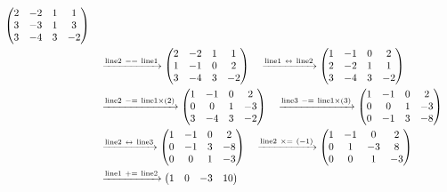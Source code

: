 \documentclass{ltjsarticle}
\begin{document}
\begin{align*}
 \begin{pmatrix}
 2 & - 2 & 1 & 1\\
 3 & - 3 & 1 & 3\\
 3 & - 4 & 3 & - 2
\end{pmatrix}\allowdisplaybreaks\\
&\ \ \ \xrightarrow{ \text{line} 2 \ -=\  \text{line} 1 } %
\begin{pmatrix}
 2 & - 2 & 1 & 1\\
 1 & -1 & 0 & 2\\
 3 & - 4 & 3 & - 2
\end{pmatrix}\ \ \ \xrightarrow{ \text{line} 1 \ \leftrightarrow\  \text{line} 2 } %
\begin{pmatrix}
 1 & -1 & 0 & 2\\
 2 & - 2 & 1 & 1\\
 3 & - 4 & 3 & - 2
\end{pmatrix}\allowdisplaybreaks\\
 &\ \ \ \xrightarrow{ \text{line} 2 \ -=\  \text{line} 1 \times\left( 2 \right)} %
\begin{pmatrix}
 1 & -1 & 0 & 2\\
 0 & 0 & 1 & - 3\\
 3 & - 4 & 3 & - 2
\end{pmatrix}\ \ \ \xrightarrow{ \text{line} 3 \ -=\  \text{line} 1 \times\left( 3 \right)} %
\begin{pmatrix}
 1 & -1 & 0 & 2\\
 0 & 0 & 1 & - 3\\
 0 & -1 & 3 & - 8
\end{pmatrix}\allowdisplaybreaks\\
 &\ \ \ \xrightarrow{ \text{line} 2 \ \leftrightarrow\  \text{line} 3 } %
\begin{pmatrix}
 1 & -1 & 0 & 2\\
 0 & -1 & 3 & - 8\\
 0 & 0 & 1 & - 3
\end{pmatrix}\ \ \ \xrightarrow{ \text{line} 2 \ \times=\ \left( - 1 \right)} %
\begin{pmatrix}
 1 & -1 & 0 & 2\\
 0 & 1 & - 3 & 8\\
 0 & 0 & 1 & - 3
\end{pmatrix}\allowdisplaybreaks\\
 &\ \ \ \xrightarrow{ \text{line} 1 \ +=\  \text{line} 2 } %
\begin{pmatrix}
 1 & 0 & - 3 & 10\\

\end{pmatrix}
\end{align*}
\end{document}

